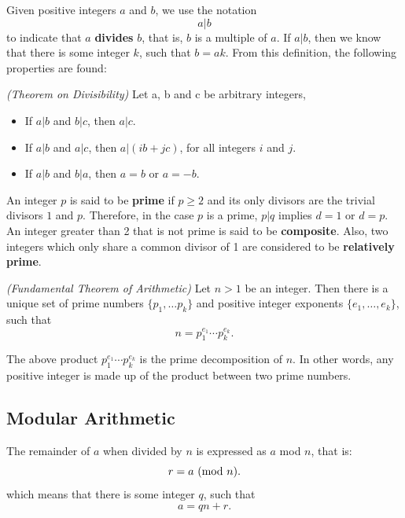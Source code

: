 Given positive integers $a$ and $b$, we use the notation 
\begin{equation}
a|b
\end{equation}
to indicate that $a$ \textbf{divides} $b$, that is, $b$ is a multiple of $a$. If $a|b$, then we know that there is some integer $k$, such that $b=ak$. From this definition, the following properties are found:

\begin{theorem}
  \emph{(Theorem on Divisibility)} Let a, b and c be arbitrary integers,
  \begin{itemize}
  \item If $a|b$ and $b|c$, then $a|c$.
  \item If $a|b$ and $a|c$, then $a|(ib+jc)$, for all integers $i$ and $j$.
  \item If $a|b$ and $b|a$, then $a=b$ or $a= -b$.
  \end{itemize}
\end{theorem}

An integer $p$ is said to be \textbf{prime} if $p\geq 2$ and its only divisors are the trivial divisors $1$ and $p$. Therefore, in the case $p$ is a prime, $p|q$ implies $d=1$ or $d=p$. An integer greater than 2 that is not prime is said to be \textbf{composite}. Also, two integers which only share a common divisor of 1 are considered to be \textbf{relatively prime}.

\begin{theorem}
\emph{(Fundamental Theorem of Arithmetic)}
Let $n > 1$ be an integer. Then there is a unique set of prime numbers $\{p_{1}, \dots p_{k}\}$ and positive integer exponents  $\{e_{1}, \dots , e_{k}\}$, such that
\begin{equation}
n = p_{1}^{e_{1}} \cdots p_{k}^{e_{k}}.
\end{equation}
\end{theorem}

The above product $p_{1}^{e_{1}} \cdots p_{k}^{e_{k}}$ is the prime decomposition of $n$. In other words, any positive integer is made up of the product between two prime numbers.   

\subsection{Modular Arithmetic}

The remainder of $a$ when divided by $n$ is expressed as $a$ mod $n$, that is:
\begin{equation}
  r = a \ (\text{mod}\ n).
\end{equation}
\noindent which means that there is some integer $q$, such that
\begin{equation}
  a = qn + r.
\end{equation}

